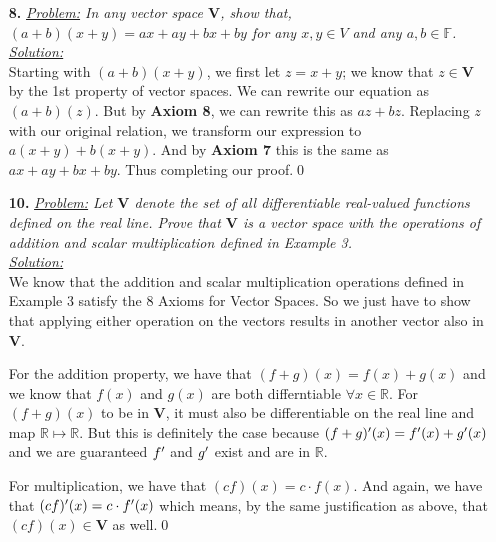 \documentclass[11pt, fleqn]{article}
\newcommand{\vectSpace}[0]{\mathbf{V}}
\begin{document}
\begin{itemize}
    
    \item [\textbf{8.}]
    \textit{\underline{Problem:} In any vector space $\mathbf{V}$, show that, $(a + b)(x + y) = ax + ay + bx + by$ for any $x,y \in V$ and any $a,b \in \mathbb{F}$.}\\[2ex]\textit{\underline{Solution:}}\\
        Starting with $(a + b)(x + y)$, we first let $z = x + y$; we know that $z\in\vectSpace$ by the 1st property of vector spaces. We can rewrite our equation as $(a + b)(z)$. But by \textbf{Axiom 8}, we can rewrite this as $az + bz$. Replacing $z$ with our original relation, we transform our expression to $a(x+y) + b(x+y)$. And by \textbf{Axiom 7} this is the same as $ax + ay + bx + by$. Thus completing our proof.\qed 
    
    \item [\textbf{10.}]
    \textit{\underline{Problem:} Let $\mathbf{V}$ denote the set of all differentiable real-valued functions defined on the real line. Prove that $\mathbf{V}$ is a vector space with the operations of addition and scalar multiplication defined in Example 3.}\\[2ex]\textit{\underline{Solution:}}\\
        We know that the addition and scalar multiplication operations defined in Example 3 satisfy the 8 Axioms for Vector Spaces. So we just have to show that applying either operation on the vectors results in another vector also in $\vectSpace$.

        \hspace{20pt}For the addition property, we have that $(f+g)(x) = f(x) + g(x)$ and we know that $f(x)$ and $g(x)$ are both differntiable $\forall x \in \mathbb{R}$. 
        For $(f+g)(x)$ to be in $\vectSpace$, it must also be differentiable on the real line and map $\mathbb{R} \mapsto \mathbb{R}$. But this is definitely the case because $(f+g)\rq(x) = f\rq(x) + g\rq(x)$ and we are guaranteed $f\rq$ and $g\rq$ exist and are in $\mathbb{R}$.

        \hspace{20pt}For multiplication, we have that $(cf)(x) = c\cdot f(x)$. And again, we have that $(cf)\rq(x) = c\cdot f\rq (x)$ which means, by the same justification as above, that $(cf)(x) \in \vectSpace$ as well.\qed


\end{itemize}
\end{document}
